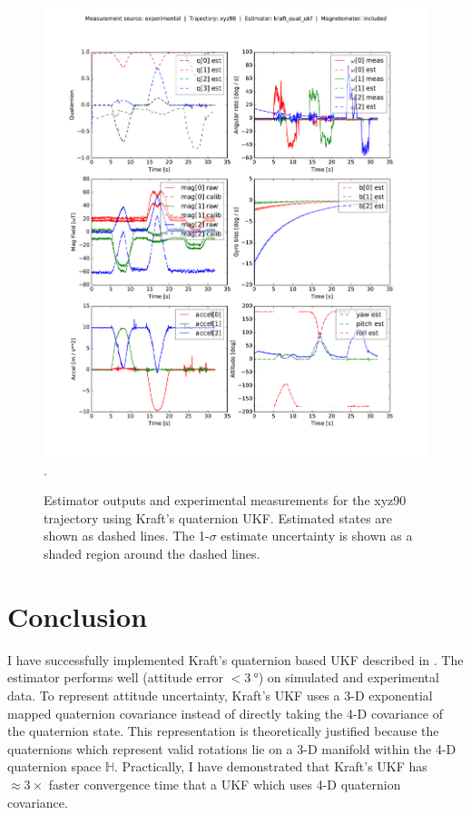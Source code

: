 \documentclass[conference]{IEEEtran}
\begin{document}
\begin{figure}[!t]
  \centering
  \includegraphics[width=7.5in]{figures/est_result_pickle_xyz90_kraft_quat_ukf_mag.pdf}
  \DeclareGraphicsExtensions.
  \caption{Estimator outputs and experimental measurements for the xyz90 trajectory using Kraft's quaternion UKF. Estimated states are shown as dashed lines. The 1-$\sigma$ estimate uncertainty is shown as a shaded region around the dashed lines.}
  \label{fig:est_result_pickle_xyz90_kraft_quat_ukf_mag}
\end{figure}


\section{Conclusion}
I have successfully implemented Kraft's quaternion based UKF described in \cite{1257247}. The estimator performs well (attitude error $< \SI{3}{\degree}$) on simulated and experimental data. To represent attitude uncertainty, Kraft's UKF uses a 3-D exponential mapped quaternion covariance instead of directly taking the 4-D covariance of the quaternion state. This representation is theoretically justified because the quaternions which represent valid rotations lie on a 3-D manifold within the 4-D quaternion space $\mathbb{H}$. Practically, I have demonstrated that Kraft's UKF has $\approx 3 \times$ faster convergence time that a UKF which uses 4-D quaternion covariance.\\
\end{document}
